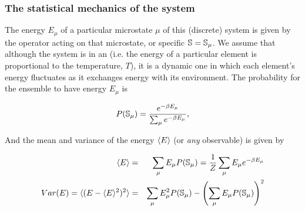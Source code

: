 \documentclass[hyperref={colorlinks=true}]{beamer}
\begin{document}

\begin{frame}%
  \frametitle{The statistical mechanics of the system}
  
  The energy $E_{\mu}$ of a particular microstate $\mu$ of this (discrete) system is given by the operator \Ham acting on that microstate, or specific  $\mathbb{S} = \mathbb{S}_{\mu}$. We assume that although the system is in an  (i.e. the energy of a particular element is proportional to the temperature, $T$), it is a dynamic one in which each element's energy fluctuates as it exchanges energy with its environment. The probability for the ensemble \spins to have energy $E_{\mu}$ is 
  
  \begin{equation}
    P(\mathbb{S}_{\mu}) = \frac{e^{-\beta E_{\mu}}}{\sum_{\mu} e^{-\beta E_{\mu}}},
  \end{equation} 

  And the mean and variance of the energy $\langle E \rangle$ (or \textit{any} observable) is given by 
  
  \begin{eqnarray}
    \langle E \rangle &=& \sum_{\mu} E_{\mu} P(\mathbb{S}_{\mu}) = \frac{1}{Z} \sum_{\mu} E_{\mu} e^{-\beta E_{\mu}} \\
    Var(E) = \langle (E-\langle E \rangle^2)^2 \rangle &=& \sum_{\mu} E^2_{\mu} P(\mathbb{S}_{\mu}) - \left( \sum_{\mu} E_{\mu} P(\mathbb{S}_{\mu}) \right)^2
  \end{eqnarray} 
  
\end{frame}

\end{document}
